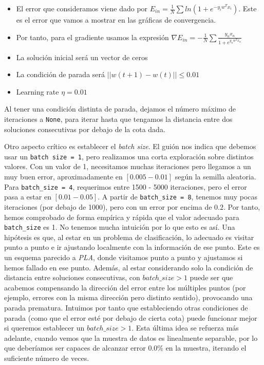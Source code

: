 \documentclass[11pt]{article}
\begin{document}
\begin{itemize}
    \item El error que consideramos viene dado por $E_{in} = \frac{1}{N} \sum ln(1 + e^{-y_i w^T x_i})$. Este es el error que vamos a mostrar en las gráficas de convergencia.
    \item Por tanto, para el gradiente usamos la expresión $\nabla E_{in} = -\frac{1}{N} \sum \frac{y_n x_n}{1+e^{y_n w^T x_n}}$
    \item La solución inicial será un vector de ceros
    \item La condición de parada será $||w(t+1) - w(t)|| \leq 0.01$
    \item Learning rate $\eta = 0.01$
\end{itemize}

Al tener una condición distinta de parada, dejamos el número máximo de iteraciones a \lstinline{None}, para iterar hasta que tengamos la distancia entre dos soluciones consecutivas por debajo de la cota dada.

Otro aspecto crítico es establecer el \emph{batch size}. El guión nos indica que debemos usar un \lstinline{batch size = 1}, pero realizamos una corta exploración sobre distintos valores. Con un valor de 1, necesitamos muchas iteraciones pero llegamos a un muy buen error, aproximadamente en $[0.005 - 0.01]$ según la semilla aleatoria. Para \lstinline{batch_size = 4}, requerimos entre 1500 - 5000 iteraciones, pero el error pasa a estar en $[0.01 - 0.05]$. A partir de \lstinline{batch_size = 8}, tenemos muy pocas iteraciones (por debajo de 1000), pero con un error por encima de $0.2$. Por tanto, hemos comprobado de forma empírica y rápida que el valor adecuado para \lstinline{batch_size} es 1. No tenemos mucha intuición por lo que esto es así. Una hipótesis es que, al estar en un problema de clasificación, lo adecuado es visitar punto a punto e ir ajustando localmente con la información de ese punto. Este es un esquema parecido a \emph{PLA}, donde visitamos punto a punto y ajustamos si hemos fallado en ese punto. Además, al estar considerando solo la condición de distancia entre soluciones consecutivas, con $batch\_size > 1$ puede ser que acabemos compensando la dirección del error entre los múltiples puntos (por ejemplo, errores con la misma dirección pero distinto sentido), provocando una parada prematura. Intuimos por tanto que estableciendo otras condiciones de parada (como que el error esté por debajo de cierta cota) puede funcionar mejor si queremos establecer un $batch\_size  >1$. Esta última idea se refuerza más adelante, cuando vemos que la muestra de datos es linealmente separable, por lo que deberíamos ser capaces de alcanzar error 0.0\% en la muestra, iterando el suficiente número de veces.
\end{document}
